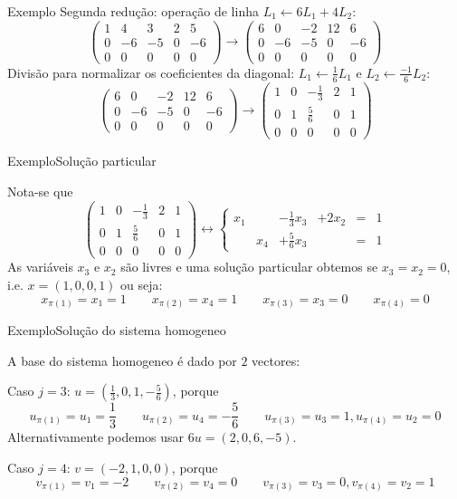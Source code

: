 \documentclass{beamer}
\begin{document}
\begin{frame}{Exemplo}
Segunda redução: operação de linha $L_1 \leftarrow 6L_1+4L_2$:
$$\left( \begin{array}{rrrr|r}
1 & 4& 3& 2& 5 \\
0&  -6& -5& 0& -6 \\
0& 0& 0& 0& 0 
\end{array}\right)
\rightarrow 
\left( \begin{array}{rrrr|r}
6 & 0&  -2& 12& 6 \\
0&  -6& -5& 0& -6 \\
0& 0& 0& 0& 0 
\end{array}\right)$$
Divisão para normalizar os coeficientes da diagonal: $L_1 \leftarrow \frac{1}{6}L_1$ e $L_2 \leftarrow \frac{-1}{6}L_2$:
$$\left( \begin{array}{rrrr|r}
6 & 0&  -2& 12& 6 \\
0&  -6& -5& 0& -6 \\
0& 0& 0& 0& 0 
\end{array}\right)
\rightarrow 
\left( \begin{array}{rrrr|r}
1 & 0&  -\frac{1}{3}& 2& 1 \\
0&  1& \frac{5}{6}& 0& 1 \\
0& 0& 0& 0& 0 
\end{array}\right)$$
\end{frame}

\begin{frame}{Exemplo}{Solução particular}

Nota-se que 
$$\left( \begin{array}{rrrr|r}
1 & 0&  -\frac{1}{3}& 2& 1 \\
0&  1& \frac{5}{6}& 0& 1 \\
0& 0& 0& 0& 0 
\end{array}\right)
\leftrightarrow 
\left\{ \begin{array}{rrrrcr}
x_1 &   &-\frac{1}{3}x_3 &+2x_2 &=&1 \\
    &   x_4      &+\frac{5}{6}x_3 & &=&1 
\end{array}\right.
$$
As variáveis $x_3$ e $x_2$ são livres e uma solução particular obtemos se $x_3=x_2=0$, i.e. $x=(1,0,0,1)$ ou seja:
$$x_{\pi(1)}=x_1=1 \qquad x_{\pi(2)}=x_4=1 \qquad x_{\pi(3)}=x_3=0 \qquad x_{\pi(4)}=0$$

\end{frame}

\begin{frame}{Exemplo}{Solução do sistema homogeneo}

A base do sistema homogeneo é dado por $2$ vectores:
\pause

Caso $j=3$: $u= (\frac{1}{3}, 0, 1, -\frac{5}{6})$, porque
$$u_{\pi(1)}=u_1=\frac{1}{3} \qquad u_{\pi(2)}=u_4=-\frac{5}{6} \qquad u_{\pi(3)}=u_3=1, u_{\pi(4)}=u_2=0$$
\pause
Alternativamente podemos usar $6u=(2,0,6,-5)$.

\medskip\pause


Caso $j=4$: $v = (-2, 1, 0, 0)$, porque
$$v_{\pi(1)}=v_1=-2 \qquad v_{\pi(2)}=v_4=0 \qquad v_{\pi(3)}=v_3=0, v_{\pi(4)}=v_2=1$$


\end{frame}
\end{document}

